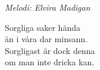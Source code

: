 {\footnotesize\textit{Melodi: Elvira Madigan}}\par
\vspace{10pt}
Sorgliga saker hända\\
än i våra dar minsann.\\
Sorgligast är dock denna\\
om man inte dricka kan.
